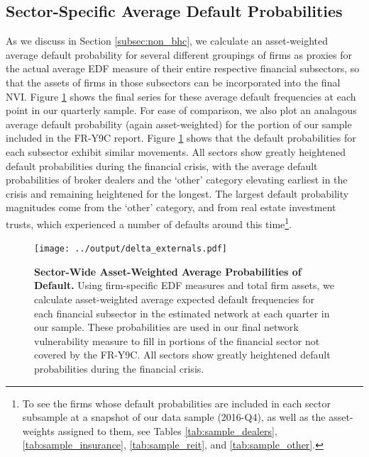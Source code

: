 \subsection{Sector-Specific Average Default Probabilities}

As we discuss in Section \ref{subsec:non_bhc}, we calculate an asset-weighted average default probability for several different groupings of firms as proxies for the actual average EDF measure of their entire respective financial subsectors, so that the assets of firms in those subsectors can be incorporated into the final NVI. Figure \ref{fig:delta_externals} shows the final series for these average default frequencies at each point in our quarterly sample. For ease of comparison, we also plot an analagous average default probability (again asset-weighted) for the portion of our sample included in the FR-Y9C report. Figure \ref{fig:delta_externals} shows that the default probabilities for each subsector exhibit similar movements. All sectors show greatly heightened default probabilities during the financial crisis, with the average default probabilities of broker dealers and the `other' category elevating earliest in the crisis and remaining heightened for the longest. The largest default probability magnitudes come from the `other' category, and from real estate investment trusts, which experienced a number of defaults around this time\footnote{To see the firms whose default probabilities are included in each sector subsample at a snapshot of our data sample (2016-Q4), as well as the asset-weights assigned to them, see Tables \ref{tab:sample_dealers}, \ref{tab:sample_insurance}, \ref{tab:sample_reit}, and \ref{tab:sample_other}.}. 

\begin{figure}[h!]
\begin{center}
\texttt{[image: ../output/delta\_externals.pdf]} 
\end{center}
\caption[]{\textbf{Sector-Wide Asset-Weighted Average Probabilities of Default.} Using firm-specific EDF measures and total firm assets, we calculate asset-weighted average expected default frequencies for each financial subsector in the estimated network at each quarter in our sample. These probabilities are used in our final network vulnerability measure to fill in portions of the financial sector not covered by the FR-Y9C. All sectors show greatly heightened default probabilities during the financial crisis.} \label{fig:delta_externals}
\end{figure}


